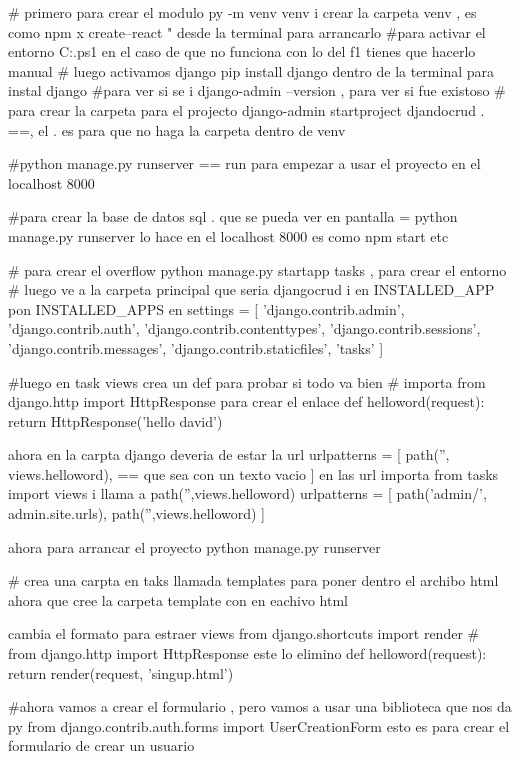 # primero para crear el modulo  py -m venv venv i crear la carpeta venv , es como npm x create--react " desde la terminal
para arrancarlo  
#para activar el entorno C:\Users\david\Desktop\django\venv\Scripts\Activate.ps1
en el caso de que no funciona con lo del f1 tienes que hacerlo manual 
# luego activamos django  pip install django dentro de la terminal para instal django
#para ver si se i django-admin --version , para ver si fue existoso 
# para crear la carpeta para el projecto django-admin startproject djandocrud . ==, el . es para que no haga la carpeta dentro de venv

#python manage.py runserver  == run para empezar a usar el proyecto en el localhost 8000

#para crear la base de datos sql . que se pueda ver en pantalla = python manage.py runserver lo hace en el localhost 8000
es como npm start etc

# para crear el overflow    python manage.py startapp tasks , para crear el entorno 
# luego ve a la carpeta principal que seria djangocrud i en INSTALLED_APP pon INSTALLED_APPS  en settings = [
    'django.contrib.admin',
    'django.contrib.auth',
    'django.contrib.contenttypes',
    'django.contrib.sessions',
    'django.contrib.messages',
    'django.contrib.staticfiles',
    'tasks'
]

#luego en task views crea un def para probar si todo va bien 
# importa from django.http import HttpResponse para crear el enlace 
def helloword(request):
 return HttpResponse('hello david')

 ahora en la carpta django deveria de estar la url urlpatterns = [
    path('', views.helloword), == que sea con un texto vacio
]
 en las url importa from tasks import views  i llama a path('',views.helloword) urlpatterns = [
    path('admin/', admin.site.urls),
    path('',views.helloword)
]

ahora para arrancar el proyecto python manage.py runserver

# crea una carpta en taks llamada templates para poner dentro el archibo html 
 ahora que cree la carpeta template con en eachivo html 

 cambia el formato para estraer views  
 from django.shortcuts import render
# from django.http import HttpResponse este lo elimino 
def helloword(request):
 return render(request, 'singup.html')


 #ahora vamos a crear el formulario , pero vamos a usar una biblioteca que nos da py
 from django.contrib.auth.forms  import UserCreationForm 
  esto es para crear el formulario de crear un usuario 

